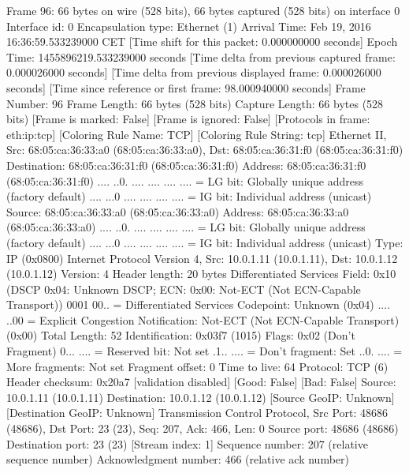 Frame 96: 66 bytes on wire (528 bits), 66 bytes captured (528 bits) on interface 0
    Interface id: 0
    Encapsulation type: Ethernet (1)
    Arrival Time: Feb 19, 2016 16:36:59.533239000 CET
    [Time shift for this packet: 0.000000000 seconds]
    Epoch Time: 1455896219.533239000 seconds
    [Time delta from previous captured frame: 0.000026000 seconds]
    [Time delta from previous displayed frame: 0.000026000 seconds]
    [Time since reference or first frame: 98.000940000 seconds]
    Frame Number: 96
    Frame Length: 66 bytes (528 bits)
    Capture Length: 66 bytes (528 bits)
    [Frame is marked: False]
    [Frame is ignored: False]
    [Protocols in frame: eth:ip:tcp]
    [Coloring Rule Name: TCP]
    [Coloring Rule String: tcp]
Ethernet II, Src: 68:05:ca:36:33:a0 (68:05:ca:36:33:a0), Dst: 68:05:ca:36:31:f0 (68:05:ca:36:31:f0)
    Destination: 68:05:ca:36:31:f0 (68:05:ca:36:31:f0)
        Address: 68:05:ca:36:31:f0 (68:05:ca:36:31:f0)
        .... ..0. .... .... .... .... = LG bit: Globally unique address (factory default)
        .... ...0 .... .... .... .... = IG bit: Individual address (unicast)
    Source: 68:05:ca:36:33:a0 (68:05:ca:36:33:a0)
        Address: 68:05:ca:36:33:a0 (68:05:ca:36:33:a0)
        .... ..0. .... .... .... .... = LG bit: Globally unique address (factory default)
        .... ...0 .... .... .... .... = IG bit: Individual address (unicast)
    Type: IP (0x0800)
Internet Protocol Version 4, Src: 10.0.1.11 (10.0.1.11), Dst: 10.0.1.12 (10.0.1.12)
    Version: 4
    Header length: 20 bytes
    Differentiated Services Field: 0x10 (DSCP 0x04: Unknown DSCP; ECN: 0x00: Not-ECT (Not ECN-Capable Transport))
        0001 00.. = Differentiated Services Codepoint: Unknown (0x04)
        .... ..00 = Explicit Congestion Notification: Not-ECT (Not ECN-Capable Transport) (0x00)
    Total Length: 52
    Identification: 0x03f7 (1015)
    Flags: 0x02 (Don't Fragment)
        0... .... = Reserved bit: Not set
        .1.. .... = Don't fragment: Set
        ..0. .... = More fragments: Not set
    Fragment offset: 0
    Time to live: 64
    Protocol: TCP (6)
    Header checksum: 0x20a7 [validation disabled]
        [Good: False]
        [Bad: False]
    Source: 10.0.1.11 (10.0.1.11)
    Destination: 10.0.1.12 (10.0.1.12)
    [Source GeoIP: Unknown]
    [Destination GeoIP: Unknown]
Transmission Control Protocol, Src Port: 48686 (48686), Dst Port: 23 (23), Seq: 207, Ack: 466, Len: 0
    Source port: 48686 (48686)
    Destination port: 23 (23)
    [Stream index: 1]
    Sequence number: 207    (relative sequence number)
    Acknowledgment number: 466    (relative ack number)
